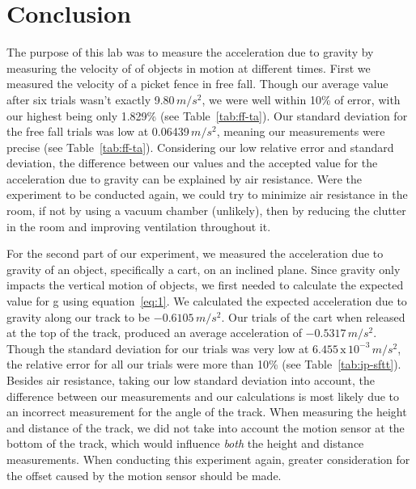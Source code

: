 
\section{Conclusion}

\vspace{-0.5cm}
\singlespacing

The purpose of this lab was to measure the acceleration due to gravity by measuring the velocity of of objects in motion at different times. First we measured the velocity of a picket fence in free fall. Though our average value after six trials wasn't exactly 9.80\,$m/s^2$, we were well within 10\% of error, with our highest being only 1.829\% (see Table~\ref{tab:ff-ta}). Our standard deviation for the free fall trials was low at 0.06439\,$m/s^2$, meaning our measurements were precise (see Table~\ref{tab:ff-ta}). Considering our low relative error and standard deviation, the difference between our values and the accepted value for the acceleration due to gravity can be explained by air resistance. Were the experiment to be conducted again, we could try to minimize air resistance in the room, if not by using a vacuum chamber (unlikely), then by reducing the clutter in the room and improving ventilation throughout it. \par
For the second part of our experiment, we measured the acceleration due to gravity of an object, specifically a cart, on an inclined plane. Since gravity only impacts the vertical motion of objects, we first needed to calculate the expected value for g using equation~\ref{eq:1}. We calculated the expected acceleration due to gravity along our track to be $-0.6105\,m/s^2$. Our trials of the cart when released at the top of the track, produced an average acceleration of $-0.5317\,m/s^2$. Though the standard deviation for our trials was very low at $6.455\,\text{x}\,10^{-3}\,m/s^2$, the relative error for all our trials were more than 10\% (see Table~\ref{tab:ip-sftt}). Besides air resistance, taking our low standard deviation into account, the difference between our measurements and our calculations is most likely due to an incorrect measurement for the angle of the track. When measuring the height and distance of the track, we did not take into account the motion sensor at the bottom of the track, which would influence \textit{both} the height and distance measurements. When conducting this experiment again, greater consideration for the offset caused by the motion sensor should be made.\par 
